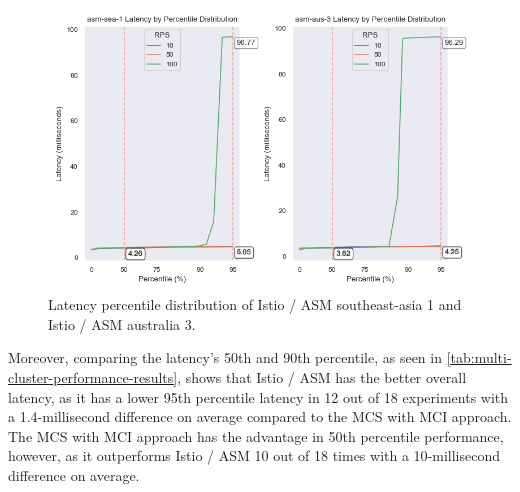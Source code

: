 \begin{figure}
	\centering
	\includegraphics[width=1\textwidth]{assets/plots/percentile-asm-sea-1-asm-aus-3.png}
    \caption{Latency percentile distribution of Istio / ASM southeast-asia 1 and Istio / ASM australia 3.}
	\label{fig:percentile-asm-sea-1-asm-aus-3}
\end{figure}



Moreover, comparing the latency's 50th and 90th percentile, as seen in \autoref{tab:multi-cluster-performance-results}, shows that Istio / ASM has the better overall latency, as it has a lower 95th percentile latency in 12 out of 18 experiments with a 1.4-millisecond difference on average compared to the MCS with MCI approach. The MCS with MCI approach has the advantage in 50th percentile performance, however, as it outperforms Istio / ASM 10 out of 18 times with a 10-millisecond difference on average.


